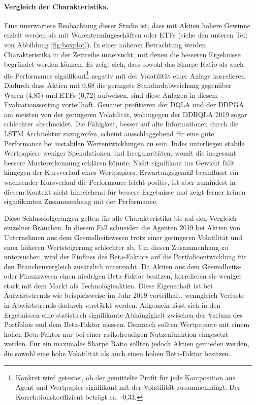 \paragraph{Vergleich der Charakteristika.}
Eine unerwartete Beobachtung dieser Studie ist, dass mit Aktien höhere Gewinne erzielt werden als mit Warentermingeschäften oder ETFs (siehe den unteren Teil von Abbildung \ref{fig:boxplot}).
In einer näheren Betrachtung werden Charakteristika in der Zeitreihe untersucht, mit denen die besseren Ergebnisse begründet werden können. 
Es zeigt sich, dass sowohl das Sharpe Ratio als auch die Performance signifikant\footnote{Konkret wird getestet, ob der gemittelte Profit für jede Komposition aus Agent und Wertpapier signifikant mit der Volatilität zusammenhängt.
Der Korrelationskoeffizient beträgt ca. -0,33.}
negativ mit der Volatilität einer Anlage korrelieren.
Dadurch dass Aktien mit 0,68 die geringste Standardabweichung gegenüber Waren (4,85) und ETFs (0,72) aufweisen, sind diese Anlagen in diesem Evaluationssetting vorteilhaft.
Genauer profitieren der \acs{DQLA} und der \acs{DDPGA} am meisten von der geringeren Volatilität, wohingegen der \acs{DDRQLA} 2019 sogar schlechter abschneidet.
Die Fähigkeit, besser auf alte Informationen durch die \acs{LSTM} Architektur zuzugreifen, scheint ausschlaggebend für eine gute Performance bei instabilen Wertentwicklungen zu sein.
Indes unterliegen stabile Wertpapiere weniger Spekulationen und Irregularitäten, womit die insgesamt bessere Mustererkennung erklären könnte.
Nicht signifikant ins Gewicht fällt hingegen der Kursverlauf eines Wertpapiers. 
Erwartungsgemäß beeinflusst ein wachsender Kursverlauf die Performance leicht positiv, ist aber zumindest in diesem Kontext nicht hinreichend für bessere Ergebnisse und zeigt ferner keinen signifikanten Zusammenhang mit der Performance.

Diese Schlussfolgerungen gelten für alle Charakteristika bis auf den Vergleich einzelner Branchen. 
In diesem Fall schneiden die Agenten 2019 bei Aktien von Unternehmen aus dem Gesundheitswesen trotz einer geringeren Volatilität und einer höheren Wertsteigerung schlechter ab.
Um diesen Zusammenhang zu untersuchen, wird der Einfluss des Beta-Faktors auf die Portfolioentwicklung für den Branchenvergleich zusätzlich untersucht.
Da Aktien aus dem Gesundheits- oder Finanzwesen einen niedrigen Beta-Faktor besitzen, korrelieren sie weniger stark mit dem Markt als Technologieaktien.
Diese Eigenschaft ist bei Aufwärtstrends wie beispielsweise im Jahr 2019 vorteilhaft, wenngleich Verluste in Abwärtstrends dadurch verstärkt werden.
Allgemein lässt sich in den Ergebnissen eine statistisch signifikante Abhängigkeit zwischen der Varianz des Portfolios und dem Beta-Faktor messen.
Demnach sollten Wertpapiere mit einem hohen Beta-Faktor nur bei einer risikofreudigen Nutzenfunktion eingesetzt werden. Für ein maximales Sharpe Ratio sollten jedoch Aktien gemieden werden, die sowohl eine hohe Volatilität als auch einen hohen Beta-Faktor besitzen. 

